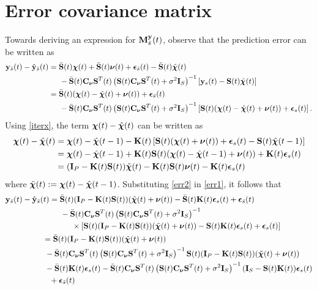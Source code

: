 \documentclass[draftcls,onecolumn,12pt]{IEEEtran}
\def \yst {{\b{y}_s(t)}}
\def \ybt {{\b{y}_{\bar{s}}(t)}}
\def \yh {{\hat{\b{y}}_{\bar{s}}}}
\def \chit {{\bs{\chi}(t)}}
\def \chih {{\hat{\bs{\chi}}}}
\def \nut {{\bs{\nu}(t)}}
\def \epst {{\bs{\epsilon}_s(t)}}
\def \epsbt {{\bs{\epsilon}_{\bar{s}}(t)}}
\def \tc {{\tilde{\bs{\chi}}(t)}}
\def \Kt {{\b{K}(t)}}
\def \si  {{\sigma^2\b{I}_S}}
\def \cnu {{\b{C}_{\bs{\nu}}}}
\def \St {{\b{S}(t)}}
\def \Stt {{\b{S}^T(t)}}
\def \Sb {{\bar{\b{S}}(t)}}
\theoremstyle{plain}\newtheorem{thm}{Theorem}
\theoremstyle{definition}
\theoremstyle{remark}
\begin{document}
\section{Error covariance matrix}\label{Aerr}
Towards deriving an expression for $\mathbf{M}^{\mathbf{y}}_{\bar{s}}(t)$, observe that the prediction error can be written as 
\begin{align}
\ybt-\yh(t) &= \Sb\chit + \Sb\nut + \epsbt - \Sb\chih(t) \nonumber\\
& \hspace{.5cm} - \Sb\cnu\Stt\left(\St\cnu\Stt + \si\right)^{-1}\left[\yst-\St\chih(t)\right] \\
&= \Sb(\chit - \chih(t) + \nut) + \epsbt \nonumber\\
& \hspace{.5cm} - \Sb\cnu\Stt\left(\St\cnu\Stt + \si\right)^{-1}\left[\St(\chit-\chih(t)+\nut) + \epst\right]. \label{err1}
\end{align}
Using \eqref{iterx}, the term $\chit-\chih(t)$ can be written as
\begin{align}
\chit-\chih(t) &= \chit-\chih(t-1) - \Kt\left[\St(\chit + \nut) + \epst - \St\chih(t-1)\right]\nonumber\\
&= \chit-\chih(t-1) + \Kt\St(\chit-\chih(t-1)+\nut) + \Kt\epst \nonumber\\
&= (\b{I}_P - \Kt\St)\tc - \Kt\St\nut -\Kt\epst \label{err2}
\end{align}
where $\tc := \chit - \chih(t-1)$. Substituting \eqref{err2} in \eqref{err1}, it follows that
\begin{align}
\ybt-\yh(t) &= \Sb(\b{I}_P - \Kt\St)(\tc+\nut) - \Sb\Kt\epst + \epsbt \nonumber\\
&\hspace{0.5cm} - \Sb\cnu\Stt\left(\St\cnu\Stt + \si\right)^{-1} \nonumber\\
&\hspace{1cm} \times \left[\St(\b{I}_P - \Kt\St)(\tc+\nut) - \St\Kt\epst +\epst \right]\\
& \hspace{-0.3cm} = \Sb(\b{I}_P - \Kt\St)(\tc+\nut) \nonumber\\
& \hspace{-0.2cm} - \Sb\cnu\Stt\left(\St\cnu\Stt + \si\right)^{-1} \St(\b{I}_P - \Kt\St)(\tc+\nut)\nonumber\\
& \hspace{-0.2cm} - \Sb\Kt\epst - \Sb\cnu\Stt\left(\St\cnu\Stt + \si\right)^{-1}(\b{I}_S-\St\Kt)\epst \nonumber\\
& + \epsbt 
\end{align}
\end{document}
